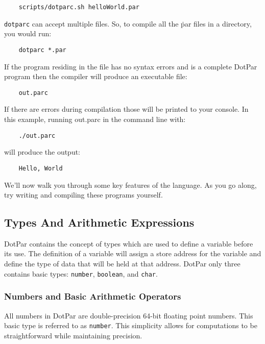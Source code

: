 \begin{verbatim}
    scripts/dotparc.sh helloWorld.par
\end{verbatim}

\verb=dotparc= can accept multiple files. So, to compile all the \.par files in
a directory, you would run:

\begin{verbatim}
    dotparc *.par
\end{verbatim}

If the program residing in the file has no syntax errors and is a complete
DotPar program then the compiler will produce an executable file:

\begin{verbatim}
    out.parc
\end{verbatim}

If there are errors during compilation those will be printed to your console. In
this example, running out.parc in the command line with:

\begin{verbatim}
    ./out.parc
\end{verbatim}

will produce the output:

\begin{verbatim}
    Hello, World
\end{verbatim}

We'll now walk you through some key features of the language. As you go along,
try writing and compiling these programs yourself.

\subsection{Types And Arithmetic Expressions}

DotPar contains the concept of types which are used to define a variable before
its use. The definition of a variable will assign a store address for the
variable and define the type of data that will be held at that address.  DotPar
only three contains basic types: \verb=number=, \verb=boolean=, and \verb=char=.

\subsubsection{Numbers and Basic Arithmetic Operators}
All numbers in DotPar are double-precision 64-bit floating point numbers.  This
basic type is referred to as \verb=number=.  This simplicity allows for
computations to be straightforward while maintaining precision.

